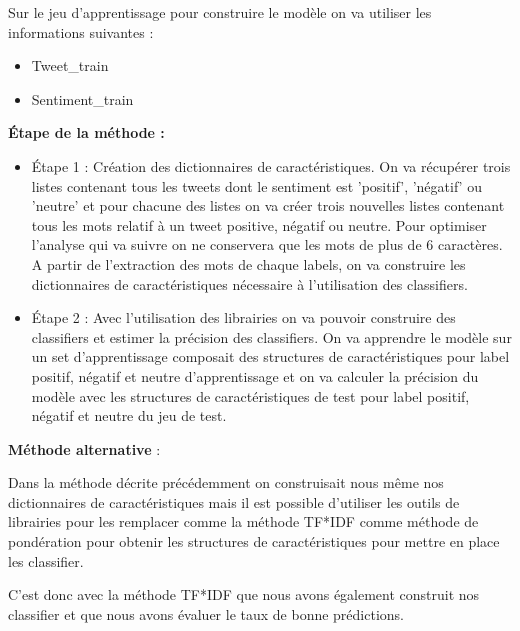 \par Sur le jeu d'apprentissage pour construire le modèle on va utiliser les informations suivantes : \\
\begin{itemize}
	\item Tweet\_train
	\item Sentiment\_train \\
\end{itemize}


\par \textbf{Étape de la méthode :} \\
\begin{itemize}
	\item Étape 1 : Création des dictionnaires de caractéristiques. On va récupérer trois listes contenant tous les tweets dont le sentiment est 'positif', 'négatif' ou 'neutre' et pour chacune des listes on va créer trois nouvelles listes contenant tous les mots relatif à un tweet positive, négatif ou neutre. Pour optimiser l'analyse qui va suivre on ne conservera que les mots de plus de 6 caractères. A partir de l'extraction des mots de chaque labels, on va construire les dictionnaires de caractéristiques nécessaire à l'utilisation des classifiers. \\
	\item Étape 2 : Avec l'utilisation des librairies on va pouvoir construire des classifiers et estimer la précision des classifiers. On va apprendre le modèle sur un set d'apprentissage composait des structures de caractéristiques pour label positif, négatif et neutre d'apprentissage et on va calculer la précision du modèle avec les structures de caractéristiques de test pour label positif, négatif et neutre du jeu de test. \\
\end{itemize}

\par \textbf{Méthode alternative }: \\
\par Dans la méthode décrite précédemment on construisait nous même nos dictionnaires de caractéristiques mais il est possible d'utiliser les outils de librairies pour les remplacer comme la méthode TF*IDF comme méthode de pondération pour obtenir les structures de caractéristiques pour mettre en place les classifier.
\par C'est donc avec la méthode TF*IDF que nous avons également construit nos classifier et que nous avons évaluer le taux de bonne prédictions.

